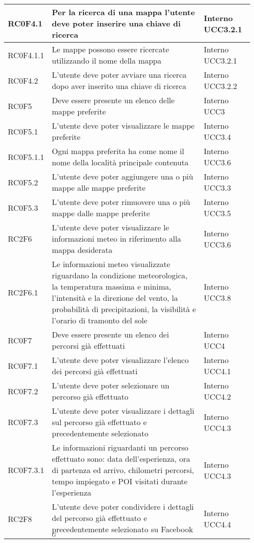 \begin{center}
\begin{longtable}{|l|p{7cm}|p{1.7cm}|}
RC0F4.1		& Per la ricerca di una mappa l'utente deve poter inserire una chiave di ricerca & Interno UCC3.2.1 \\\hline
RC0F4.1.1	& Le mappe possono essere ricercate utilizzando il nome della mappa & Interno UCC3.2.1 \\\hline
RC0F4.2		& L'utente deve poter avviare una ricerca dopo aver inserito una chiave di ricerca & Interno UCC3.2.2 \\\hline
RC0F5 		& Deve essere presente un elenco delle mappe preferite & Interno UCC3 \\\hline
RC0F5.1 	& L'utente deve poter visualizzare le mappe preferite & Interno UCC3.4 \\\hline
RC0F5.1.1	& Ogni mappa preferita ha come nome il nome della località principale contenuta & Interno UCC3.6 \\\hline
RC0F5.2 	& L'utente deve poter aggiungere una o più mappe alle mappe preferite & Interno UCC3.3 \\\hline
RC0F5.3		& L'utente deve poter rimuovere una o più mappe dalle mappe preferite & Interno UCC3.5 \\\hline
RC2F6 		& L'utente deve poter visualizzare le informazioni meteo in riferimento alla mappa desiderata & Interno UCC3.6 \\\hline
RC2F6.1		& Le informazioni meteo visualizzate riguardano la condizione meteorologica, la temperatura massima e minima, l'intensità e la direzione del vento, la probabilità di precipitazioni, la visibilità e l'orario di tramonto del sole & Interno UCC3.8 \\\hline
RC0F7 		& Deve essere presente un elenco dei percorsi già effettuati & Interno UCC4 \\\hline
RC0F7.1		& L'utente deve poter visualizzare l'elenco dei percorsi già effettuati & Interno UCC4.1 \\\hline
RC0F7.2		& L'utente deve poter selezionare un percorso già effettuato & Interno UCC4.2 \\\hline
RC0F7.3		& L'utente deve poter visualizzare i dettagli sul percorso già effettuato e precedentemente selezionato & Interno UCC4.3 \\\hline
RC0F7.3.1	& Le informazioni riguardanti un percorso effettuato sono: data dell'esperienza, ora di partenza ed arrivo, chilometri percorsi, tempo impiegato e POI visitati durante l'esperienza & Interno UCC4.3 \\\hline
RC2F8		& L'utente deve poter condividere i dettagli del percorso già effettuato e precedentemente selezionato su Facebook$_{G}$ & Interno UCC4.4 \\\hline

\end{longtable}
\end{center}
